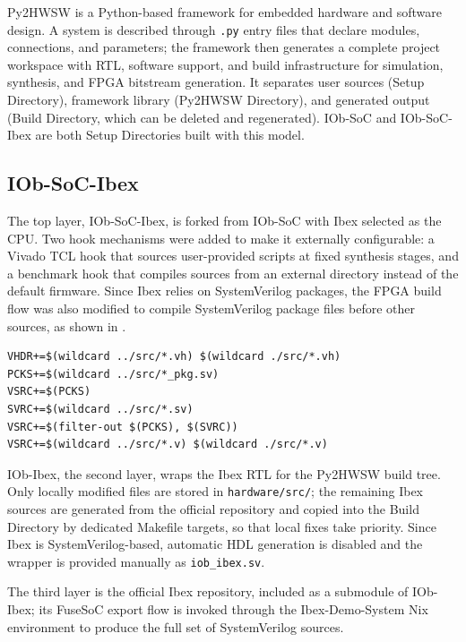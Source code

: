 Py2HWSW is a Python-based framework for embedded hardware and software design. A system is described through \texttt{.py} entry files that declare modules, connections, and parameters; the framework then generates a complete project workspace with \ac{RTL}, software support, and build infrastructure for simulation, synthesis, and \ac{FPGA} bitstream generation. It separates user sources (Setup Directory), framework library (Py2HWSW Directory), and generated output (Build Directory, which can be deleted and regenerated). IOb-\ac{SoC} and IOb-\ac{SoC}-Ibex are both Setup Directories built with this model.



\subsection{IOb-SoC-Ibex}
\label{chap5:iob-soc-ibex}

The top layer, IOb-SoC-Ibex, is forked from IOb-SoC with Ibex selected as the \ac{CPU}. Two hook mechanisms were added to make it externally configurable: a Vivado \ac{TCL} hook that sources user-provided scripts at fixed synthesis stages, and a benchmark hook that compiles sources from an external directory instead of the default firmware. Since Ibex relies on SystemVerilog packages, the \ac{FPGA} build flow was also modified to compile SystemVerilog package files before other sources, as shown in .

\begin{lstlisting}[float=h,language=matlabfloz,caption={Portion of the modified Py2HWSW \ac{FPGA} Makefile enforcing package ordering}, label={lst:src_order}]
VHDR+=$(wildcard ../src/*.vh) $(wildcard ./src/*.vh)
PCKS+=$(wildcard ../src/*_pkg.sv)
VSRC+=$(PCKS)
SVRC+=$(wildcard ../src/*.sv)
VSRC+=$(filter-out $(PCKS), $(SVRC))
VSRC+=$(wildcard ../src/*.v) $(wildcard ./src/*.v)
\end{lstlisting}

IOb-Ibex, the second layer, wraps the Ibex \ac{RTL} for the Py2HWSW build tree. Only locally modified files are stored in \texttt{hardware/src/}; the remaining Ibex sources are generated from the official repository and copied into the Build Directory by dedicated Makefile targets, so that local fixes take priority. Since Ibex is SystemVerilog-based, automatic \ac{HDL} generation is disabled and the wrapper is provided manually as \texttt{iob\_ibex.sv}.

The third layer is the official Ibex repository, included as a submodule of IOb-Ibex; its FuseSoC export flow is invoked through the Ibex-Demo-System \cite{ibex-demo-system} Nix environment to produce the full set of SystemVerilog sources.





